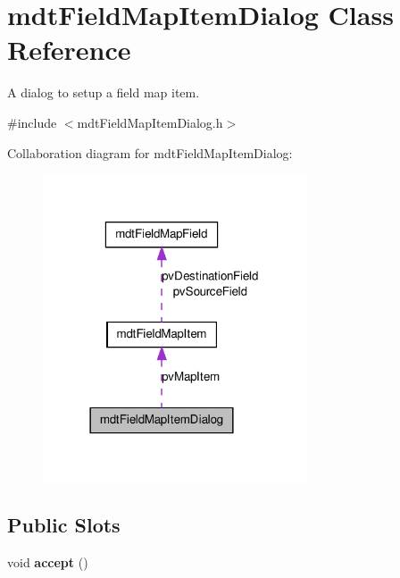 \hypertarget{classmdt_field_map_item_dialog}{
\section{mdtFieldMapItemDialog Class Reference}
\label{classmdt_field_map_item_dialog}
}


A dialog to setup a field map item.  




{\ttfamily \#include $<$mdtFieldMapItemDialog.h$>$}



Collaboration diagram for mdtFieldMapItemDialog:
\nopagebreak
\begin{figure}[H]
\begin{center}
\leavevmode
\includegraphics[width=222pt]{classmdt_field_map_item_dialog__coll__graph}
\end{center}
\end{figure}
\subsection*{Public Slots}
\begin{DoxyCompactItemize}
\item 
\hypertarget{classmdt_field_map_item_dialog_a43b775a21d170f8d801f7c493cfdcdcc}{
void {\bfseries accept} ()}
\label{classmdt_field_map_item_dialog_a43b775a21d170f8d801f7c493cfdcdcc}

\end{DoxyCompactItemize}
